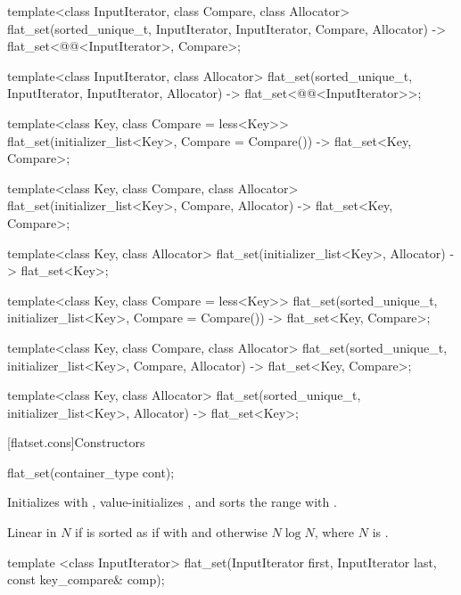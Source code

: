 \begin{codeblock}
\begin{codeblock}
\begin{codeblock}
\begin{addedblock}
\begin{codeblock}
{  template<class InputIterator, class Compare, class Allocator>
    flat_set(sorted_unique_t, InputIterator, InputIterator, Compare, Allocator)
      -> flat_set<@@<InputIterator>, Compare>;

  template<class InputIterator, class Allocator>
    flat_set(sorted_unique_t, InputIterator, InputIterator, Allocator)
      -> flat_set<@@<InputIterator>>;

  template<class Key, class Compare = less<Key>>
    flat_set(initializer_list<Key>, Compare = Compare())
      -> flat_set<Key, Compare>;

  template<class Key, class Compare, class Allocator>
    flat_set(initializer_list<Key>, Compare, Allocator)
      -> flat_set<Key, Compare>;

  template<class Key, class Allocator>
    flat_set(initializer_list<Key>, Allocator)
      -> flat_set<Key>;

  template<class Key, class Compare = less<Key>>
    flat_set(sorted_unique_t, initializer_list<Key>, Compare = Compare())
      -> flat_set<Key, Compare>;

  template<class Key, class Compare, class Allocator>
    flat_set(sorted_unique_t, initializer_list<Key>, Compare, Allocator)
      -> flat_set<Key, Compare>;

  template<class Key, class Allocator>
    flat_set(sorted_unique_t, initializer_list<Key>, Allocator)
      -> flat_set<Key>;
}
\end{codeblock}

[flatset.cons]{Constructors}

%
\begin{itemdecl}
flat_set(container_type cont);
\end{itemdecl}

\begin{itemdescr}
\pnum
\effects Initializes  with , value-initializes
, and sorts the range  with
.

\pnum
\complexity
Linear in $N$ if  is sorted as if with  and
otherwise $N \log N$, where $N$ is .
\end{itemdescr}

%
\begin{itemdecl}
template <class InputIterator>
  flat_set(InputIterator first, InputIterator last, const key_compare& comp);
\end{itemdecl}


\end{addedblock}
\end{codeblock}
\end{codeblock}
\end{codeblock}
